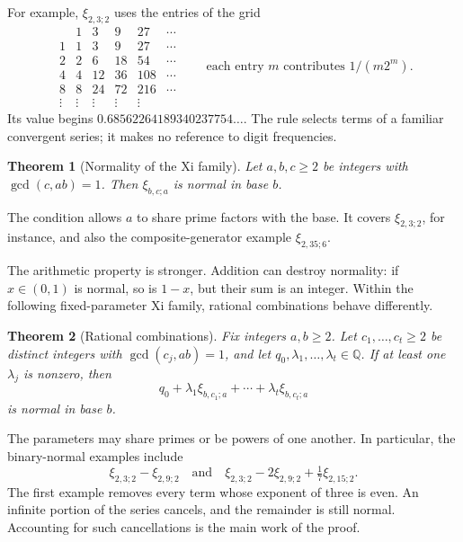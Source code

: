 \documentclass[11pt]{article}
\newtheorem{theorem}{Theorem}
\newcommand{\Q}{\mathbb Q}
\begin{document}
For example, \(\xi_{2,3;2}\) uses the entries of the grid
\[
\begin{array}{c|rrrrr}
 & 1&3&9&27&\cdots\\ \hline
1&1&3&9&27&\cdots\\
2&2&6&18&54&\cdots\\
4&4&12&36&108&\cdots\\
8&8&24&72&216&\cdots\\
\vdots&\vdots&\vdots&\vdots&\vdots&
\end{array}
\qquad\text{each entry \(m\) contributes \(1/(m2^m)\).}
\]
Its value begins \(0.68562264189340237754\ldots\). The rule selects
terms of a familiar convergent series; it makes no reference to digit
frequencies.

\begin{theorem}[Normality of the Xi family]\label{thm:normal}
Let \(a,b,c\ge2\) be integers with \(\gcd(c,ab)=1\). Then
\(\xi_{b,c;a}\) is normal in base \(b\).
\end{theorem}

The condition allows \(a\) to share prime factors with the base. It
covers \(\xi_{2,3;2}\), for instance, and also the composite-generator
example \(\xi_{2,35;6}\).

The arithmetic property is stronger. Addition can destroy normality:
if \(x\in(0,1)\) is normal, so is \(1-x\), but their sum is an
integer. Within the following fixed-parameter Xi family, rational
combinations behave differently.

\begin{theorem}[Rational combinations]\label{thm:arithmetic}
Fix integers \(a,b\ge2\). Let \(c_1,\ldots,c_t\ge2\) be distinct
integers with \(\gcd(c_j,ab)=1\), and let
\(q_0,\lambda_1,\ldots,\lambda_t\in\Q\). If at least one
\(\lambda_j\) is nonzero, then
\begin{equation}\label{eq:main-combination}
 q_0+\lambda_1\xi_{b,c_1;a}+\cdots+\lambda_t\xi_{b,c_t;a}
\end{equation}
is normal in base \(b\).
\end{theorem}

The parameters may share primes or be powers of one another. In
particular, the binary-normal examples include
\[
 \xi_{2,3;2}-\xi_{2,9;2}
 \quad\text{and}\quad
 \xi_{2,3;2}-2\xi_{2,9;2}+\tfrac17\xi_{2,15;2}.
\]
The first example removes every term whose exponent of three is even.
An infinite portion of the series cancels, and the remainder is still
normal. Accounting for such cancellations is the main work of the proof.
\end{document}

